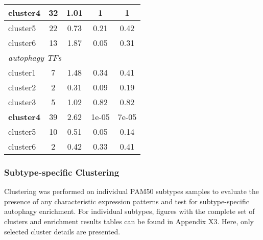 \begin{table}[!h]
\begin{tabular}{lcccc}
            \multicolumn{1}{l|}{cluster4} & \multicolumn{1}{c|}{32} & \multicolumn{1}{c|}{1.01} & \multicolumn{1}{c|}{1} & 1 \\ \hline
            \multicolumn{1}{l|}{cluster5} & \multicolumn{1}{c|}{22} & \multicolumn{1}{c|}{0.73} & \multicolumn{1}{c|}{0.21} & 0.42 \\ \hline
            \multicolumn{1}{l|}{cluster6} & \multicolumn{1}{c|}{13} & \multicolumn{1}{c|}{1.87} & \multicolumn{1}{c|}{0.05} & 0.31 \\ \hline
            \multicolumn{5}{l}{\textit{autophagy TFs}} \\ \hline
            \multicolumn{1}{l|}{cluster1} & \multicolumn{1}{c|}{7} & \multicolumn{1}{c|}{1.48} & \multicolumn{1}{c|}{0.34} & 0.41 \\ \hline
            \multicolumn{1}{l|}{cluster2} & \multicolumn{1}{c|}{2} & \multicolumn{1}{c|}{0.31} & \multicolumn{1}{c|}{0.09} & 0.19 \\ \hline
            \multicolumn{1}{l|}{cluster3} & \multicolumn{1}{c|}{5} & \multicolumn{1}{c|}{1.02} & \multicolumn{1}{c|}{0.82} & 0.82 \\ \hline
            \multicolumn{1}{l|}{\textbf{cluster4}} & \multicolumn{1}{c|}{39} & \multicolumn{1}{c|}{2.62} & \multicolumn{1}{c|}{1e-05} & 7e-05 \\ \hline
            \multicolumn{1}{l|}{cluster5} & \multicolumn{1}{c|}{10} & \multicolumn{1}{c|}{0.51} & \multicolumn{1}{c|}{0.05} & 0.14 \\ \hline
            \multicolumn{1}{l|}{cluster6} & \multicolumn{1}{c|}{2} & \multicolumn{1}{c|}{0.42} & \multicolumn{1}{c|}{0.33} & 0.41 \\ \hline
            \end{tabular}
            \end{table}
        
     
        \newpage
        \subsubsection{Subtype-specific Clustering}
        
        Clustering was performed on individual PAM50 subtypes samples to evaluate the presence of any characteristic expression patterns and test for subtype-specific autophagy enrichment. 
        For individual subtypes, figures with the complete set of clusters and enrichment results tables can be found in Appendix X3. Here, only selected cluster details are presented. 
        

